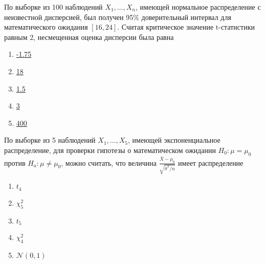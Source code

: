 \documentclass[t]{beamer}
\newcommand{\cN}{\mathcal{N}}
\begin{document}
 \begin{frame} \label{36} 
\begin{block}{36} 

  По выборке из 100 наблюдений $X_1,\ldots,X_{n}$, имеющей нормальное распределение с неизвестной дисперсией, был получен 95\% доверительный интервал для математического ожидания $[16,24]$. Считая критическое значение t-статистики равным 2, несмещенная оценка дисперсии была равна


 \end{block} 
\begin{enumerate} 
\item[] \hyperlink{36-No}{\beamergotobutton{} -1.75}
\item[] \hyperlink{36-No}{\beamergotobutton{} 18}
\item[] \hyperlink{36-No}{\beamergotobutton{} 1.5}
\item[] \hyperlink{36-No}{\beamergotobutton{} 3}
\item[] \hyperlink{36-Yes}{\beamergotobutton{} 400}
\end{enumerate} 
\end{frame} 


 \begin{frame} \label{37} 
\begin{block}{37} 

  По выборке из 5 наблюдений $X_1,\ldots,X_{5}$, имеющей экспоненциальное распределение, для проверки гипотезы о математическом ожидании $H_0: \mu = \mu_0$ против $H_a: \mu \ne \mu_0$, можно считать, что величина $\frac{\bar{X} - \mu_0}{\sqrt{\hat{\sigma}^2 / n}}$ имеет распределение


 \end{block} 
\begin{enumerate} 
\item[] \hyperlink{37-No}{\beamergotobutton{} $t_4$}
\item[] \hyperlink{37-No}{\beamergotobutton{} $\chi^2_5$}
\item[] \hyperlink{37-No}{\beamergotobutton{} $t_5$}
\item[] \hyperlink{37-No}{\beamergotobutton{} $\chi^2_4$}
\item[] \hyperlink{37-No}{\beamergotobutton{} $\cN(0,1)$}
\end{enumerate} 
\end{frame} 
\end{document}
